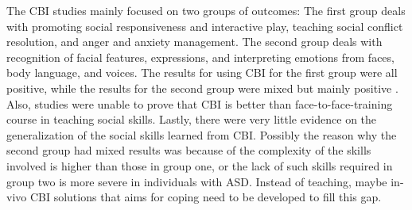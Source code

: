 \documentclass{ut-thesis}
\begin{document}
The CBI studies mainly focused on two groups of outcomes: The first group deals with promoting social responsiveness and interactive play, teaching social conflict resolution, and anger and anxiety management.  The second group deals with recognition of facial features, expressions, and interpreting emotions from faces, body language, and voices.  The results for using CBI for the first group were all positive, while the results for the second group were mixed but mainly positive \cite{ramdoss2012computer}.  Also, studies were unable to prove that CBI is better than face-to-face-training course in teaching social skills.  Lastly, there were very little evidence on the generalization of the social skills learned from CBI.  Possibly the reason why the second group had mixed results was because of the complexity of the skills involved is higher than those in group one, or the lack of such skills required in group two is more severe in individuals with ASD.  Instead of teaching, maybe in-vivo CBI solutions that aims for coping need to be developed to fill this gap.
\end{document}

